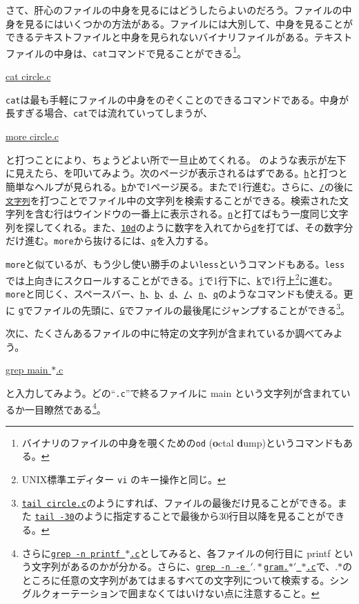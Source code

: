 さて、肝心のファイルの中身を見るにはどうしたらよいのだろう。ファイルの中身を見るにはいくつかの方法がある。ファイルには大別して、中身を見ることができるテキストファイルと中身を見られないバイナリファイルがある。テキストファイルの中身は、{\tt cat}コマンドで見ることができる\footnote{バイナリのファイルの中身を覗くための{\tt od} ({\bf o}ctal {\bf d}ump)というコマンドもある。}。
\begin{commandline2}
\prompt \underline{cat circle.c}
\end{commandline2} \noindent
{\tt cat}は最も手軽にファイルの中身をのぞくことのできるコマンドである。中身が長すぎる場合、{\tt cat}では流れていってしまうが、
\begin{commandline2}
\prompt \underline{more circle.c}
\end{commandline2} \noindent
と打つことにより、ちょうどよい所で一旦止めてくれる。 のような表示が左下に見えたら、\spc を叩いてみよう。次のページが表示されるはずである。\underline{\tt h}と打つと簡単なヘルプが見られる。\underline{\tt b}かで1ページ戻る。また\ret で1行進む。さらに、\underline{\tt /}の後に\underline{\tt 文字列}を打つことでファイル中の文字列を検索することができる。検索された文字列を含む行はウインドウの一番上に表示される。\underline{\tt n}と打てばもう一度同じ文字列を探してくれる。また、\underline{\tt 10d}のように数字を入れてから\underline{\tt d}を打てば、その数字分だけ進む。{\tt more}から抜けるには、\underline{\tt q}を入力する。

{\tt more}と似ているが、もう少し使い勝手のよい{\tt less}\label{sect:less}というコマンドもある。{\tt less}では上向きにスクロールすることができる。\underline{\tt j}で1行下に、\underline{\tt k}で1行上\footnote{UNIX標準エディター {\tt vi} のキー操作と同じ。}に進む。{\tt more}と同じく、スペースバー、\underline{\tt h}、\underline{\tt b}、\underline{\tt d}、\underline{\tt /}、\underline{\tt n}、\underline{\tt q}のようなコマンドも使える。更に \underline{\tt g}でファイルの先頭に、\underline{\tt G}でファイルの最後尾にジャンプすることができる\footnote{{\tt \underline{tail circle.c}}のようにすれば、ファイルの最後だけ見ることができる。また \underline{\tt tail -30}のように指定することで最後から30行目以降を見ることができる。}。

次に、たくさんあるファイルの中に特定の文字列が含まれているか調べてみよう。
\begin{commandline2}
\prompt \underline{grep main $\ast$.c}
\end{commandline2} \noindent
と入力してみよう。どの``{\tt .c}''で終るファイルに main という文字列が含まれているか一目瞭然である\footnote{さらに\texttt{\underline{grep -n printf $\ast$.c}}としてみると、各ファイルの何行目に printf という文字列があるのかが分かる。さらに、\texttt{\underline{grep -n -e $'.\ast$gram.$\ast'$ $\ast$.c}}で、.$\ast$のところに任意の文字列があてはまるすべての文字列について検索する。シングルクォーテーションで囲まなくてはいけない点に注意すること。}。

